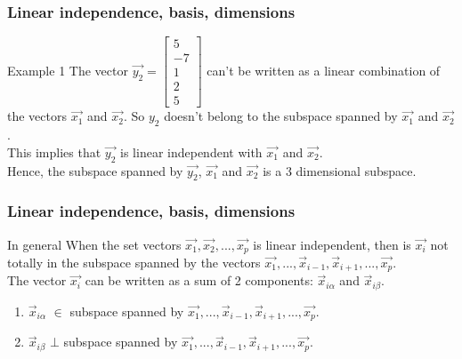 \begin{frame}
	\frametitle{Linear independence, basis, dimensions}
	\begin{block}{Example 1}
		The vector $\overrightarrow{y_2}=\begin{bmatrix} 5\\-7\\1\\2\\5\end{bmatrix}$ can't be written as a linear combination of the vectors $\overrightarrow{x_1}$ and $\overrightarrow{x_2}$. So $y_2$ doesn't belong to the subspace spanned by $\overrightarrow{x_1}$ and $\overrightarrow{x_2}$.\\
		This implies that $\overrightarrow{y_2}$ is linear independent with $\overrightarrow{x_1}$ and $\overrightarrow{x_2}$.\\
		 Hence, the subspace spanned by $\overrightarrow{y_2}$, $\overrightarrow{x_1}$ and $\overrightarrow{x_2}$ is a 3 dimensional subspace.
	\end{block}
\end{frame}

\begin{frame}
	\frametitle{Linear independence, basis, dimensions}
	\begin{block}{In general}
		When the set vectors $\overrightarrow{x_1},\overrightarrow{x_2},..., \overrightarrow{x_p}$ is linear independent, then is $\overrightarrow{x_i}$ not totally in the subspace spanned by the vectors $\overrightarrow{x_1},..., \overrightarrow{x}_{i-1}, \overrightarrow{x}_{i+1},...,\overrightarrow{x_p}$.\\
		The vector $\overrightarrow{x_i}$ can be written as a sum of 2 components: $\overrightarrow{x}_{i\alpha}$ and $\overrightarrow{x}_{i\beta}$.
		\begin{enumerate}
			\item $\overrightarrow{x}_{i\alpha}$ $\in$ subspace spanned by $\overrightarrow{x_1},..., \overrightarrow{x}_{i-1}, \overrightarrow{x}_{i+1},...,\overrightarrow{x_p}$.
			\item $\overrightarrow{x}_{i\beta}$ $\bot$ subspace spanned by $\overrightarrow{x_1},..., \overrightarrow{x}_{i-1}, \overrightarrow{x}_{i+1},...,\overrightarrow{x_p}$.
		\end{enumerate}
	\end{block}
\end{frame}

